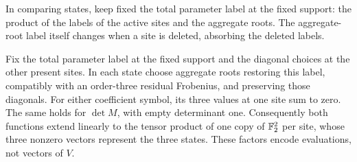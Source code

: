 In comparing states, keep fixed the total parameter label at the fixed
support: the product of the labels of the active sites and the aggregate
roots. The aggregate-root label itself changes when a site is deleted,
absorbing the deleted labels.

\begin{lemma}\label{lem:lm:site-relations}
Fix the total parameter label at the fixed support and the diagonal
choices at the other present sites. In each state choose aggregate
roots restoring this label, compatibly with an order-three residual
Frobenius, and preserving those diagonals. For either coefficient
symbol, its three values at one site sum to zero. The same holds for
$\det M$, with empty determinant one.
Consequently both functions extend linearly to the tensor product of
one copy of $\mathbb F_2^2$ per site, whose three nonzero vectors represent
the three states. These factors encode evaluations, not vectors of $V$.
\end{lemma}

